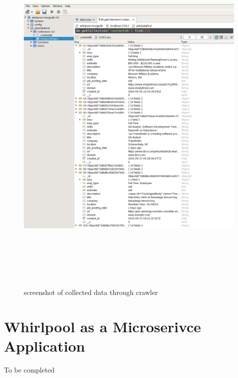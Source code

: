 \begin{figure}[h!]
  \centering
  \includegraphics[width=12cm,height=18cm,keepaspectratio]{../media/crawler/collecteddata.png}
  \caption{screenshot of collected data through crawler}
  \label{fig:mongo_data}
\end{figure}
\pagebreak


\pagebreak

\section{Whirlpool as a Microserivce Application}
To be completed

\pagebreak
